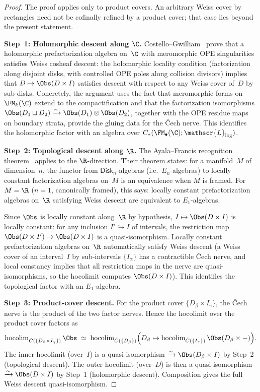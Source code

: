 \begin{proof}
The proof applies only to product covers. An arbitrary Weiss cover
by rectangles need not be cofinally refined by a product cover; that
case lies beyond the present statement.

\medskip\noindent
\textbf{Step~1: Holomorphic descent along $\C$.}
Costello--Gwilliam~\cite[Chapter~5, \S5.4]{CG17} prove that a
holomorphic prefactorization algebra on~$\C$ with meromorphic OPE
singularities satisfies Weiss cosheaf descent: the
holomorphic locality condition (factorization along disjoint disks,
with controlled OPE poles along collision divisors)
implies that $D \mapsto \Obs(D \times I)$ satisfies descent with
respect to any Weiss cover of~$D$ by sub-disks.
Concretely, the argument uses the fact that meromorphic forms on
$\FM_k(\C)$ extend to the compactification and that the
factorization isomorphisms
$\Obs(D_1 \sqcup D_2) \xrightarrow{\sim} \Obs(D_1) \otimes
\Obs(D_2)$, together with the OPE residue maps on boundary strata,
provide the gluing data for the \v{C}ech nerve. This identifies the
holomorphic factor with an algebra over
$C_\ast(\FM_\bullet(\C); \mathscr{L}_{\log})$.

\medskip\noindent
\textbf{Step~2: Topological descent along $\R$.}
The Ayala--Francis recognition theorem~\cite[Theorem~3.24]{AF15} applies to the
$\R$-direction. Their theorem states: for a manifold~$M$ of
dimension~$n$, the functor from $\mathsf{Disk}_n$-algebras (i.e.\
$E_n$-algebras) to locally constant factorization algebras on~$M$ is
an equivalence when $M$ is framed. For $M = \R$ ($n = 1$, canonically
framed), this says: locally constant prefactorization algebras
on~$\R$ satisfying Weiss descent are equivalent to $E_1$-algebras.

Since $\Obs$ is locally constant along~$\R$ by hypothesis,
$I \mapsto \Obs(D \times I)$ is locally constant: for any inclusion
$I' \hookrightarrow I$ of intervals, the restriction map
$\Obs(D \times I') \to \Obs(D \times I)$ is a quasi-isomorphism.
Locally constant prefactorization algebras on~$\R$ automatically
satisfy Weiss descent (a Weiss cover of an interval~$I$ by
sub-intervals $\{I_\alpha\}$ has a contractible \v{C}ech nerve, and
local constancy implies that all restriction maps in the nerve are
quasi-isomorphisms, so the hocolimit computes $\Obs(D \times I)$).
This identifies the topological factor with an $E_1$-algebra.

\medskip\noindent
\textbf{Step~3: Product-cover descent.}
For the product cover $\{D_\beta\times I_\gamma\}$, the
\v{C}ech nerve is the product of the two factor nerves. Hence the
hocolimit over the product cover factors as
\[
 \operatorname{hocolim}_{\check{C}(\{D_\beta \times I_\gamma\})} \Obs
 \;\simeq\;
 \operatorname{hocolim}_{\check{C}(\{D_\beta\})}
 \Bigl(D_\beta \mapsto
 \operatorname{hocolim}_{\check{C}(\{I_\gamma\})} \Obs(D_\beta \times -)
 \Bigr).
\]
The inner hocolimit (over~$I$) is a quasi-isomorphism
$\xrightarrow{\sim} \Obs(D_\beta \times I)$ by Step~2
(topological descent). The outer hocolimit (over~$D$) is then a
quasi-isomorphism
$\xrightarrow{\sim} \Obs(D \times I)$ by Step~1
(holomorphic descent). Composition gives the full Weiss descent
quasi-isomorphism.
\end{proof}

